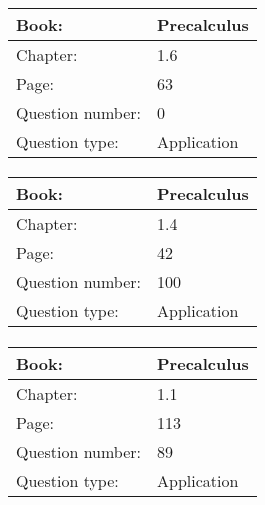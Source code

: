 \documentclass{article}
\begin{document}
            \paragraph{}
            \begin{tabularx}{1\textwidth}{
                    p{}
                    p{}
                }
                \toprule
                Book: & Precalculus
                \\
                \midrule
                Chapter: & 1.6
                \\
                \midrule
                Page: & 63
                \\
                \midrule
                Question number: & 0
                \\
                \midrule
                Question type: & Application
                \\
                \bottomrule
            \end{tabularx}
            
            \paragraph{}
            \begin{tabularx}{1\textwidth}{
                    p{}
                    p{}
                }
                \toprule
                Book: & Precalculus
                \\
                \midrule
                Chapter: & 1.4
                \\
                \midrule
                Page: & 42
                \\
                \midrule
                Question number: & 100
                \\
                \midrule
                Question type: & Application
                \\
                \bottomrule
            \end{tabularx}
            
            \paragraph{}
            \begin{tabularx}{1\textwidth}{
                    p{}
                    p{}
                }
                \toprule
                Book: & Precalculus
                \\
                \midrule
                Chapter: & 1.1
                \\
                \midrule
                Page: & 113
                \\
                \midrule
                Question number: & 89
                \\
                \midrule
                Question type: & Application
                \\
                \bottomrule
            \end{tabularx}
            
\end{document}
